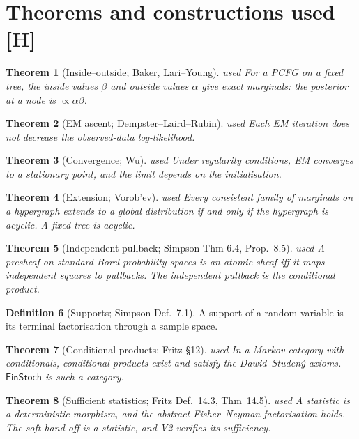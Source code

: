 \documentclass[11pt]{article}
\newtheorem{theorem}{Theorem}[section]
\theoremstyle{definition}
\newtheorem{definition}[theorem]{Definition}
\theoremstyle{remark}
\newcommand{\src}[1]{\textsf{\small[#1]}}
\newcommand{\st}[1]{\textsf{\small\color{gray}#1}}
\begin{document}
\section{Theorems and constructions used \src{H}}\label{sec:theoremsused}
\begin{theorem}[Inside--outside; Baker, Lari--Young]\label{thm:io}\st{used} \cite{baker}
For a PCFG on a fixed tree, the inside values $\beta$ and outside values $\alpha$ give exact marginals: the posterior at a node is $\propto\alpha\beta$.
\end{theorem}
\begin{theorem}[EM ascent; Dempster--Laird--Rubin]\label{thm:em}\st{used} \cite{dlr}
Each EM iteration does not decrease the observed-data log-likelihood.
\end{theorem}
\begin{theorem}[Convergence; Wu]\label{res:auto1}\st{used} \cite{wu}
Under regularity conditions, EM converges to a stationary point, and the limit depends on the initialisation.
\end{theorem}
\begin{theorem}[Extension; Vorob'ev]\label{thm:vorobev}\st{used}
Every consistent family of marginals on a hypergraph extends to a global distribution if and only if the hypergraph is acyclic. A fixed tree is acyclic.
\end{theorem}
\begin{theorem}[Independent pullback; Simpson Thm 6.4, Prop.~8.5]\label{res:auto2}\st{used}
A presheaf on standard Borel probability spaces is an atomic sheaf iff it maps independent squares to pullbacks. The independent pullback is the conditional product.
\end{theorem}
\begin{definition}[Supports; Simpson Def.~7.1] A support of a random variable is its terminal factorisation through a sample space.\end{definition}
\begin{theorem}[Conditional products; Fritz \S12]\label{res:auto3}\st{used}
In a Markov category with conditionals, conditional products exist and satisfy the Dawid--Studen\'y axioms. $\mathsf{FinStoch}$ is such a category.
\end{theorem}
\begin{theorem}[Sufficient statistics; Fritz Def.~14.3, Thm~14.5]\label{res:auto4}\st{used}
A statistic is a deterministic morphism, and the abstract Fisher--Neyman factorisation holds. The soft hand-off is a statistic, and V2 verifies its sufficiency.
\end{theorem}
\end{document}
